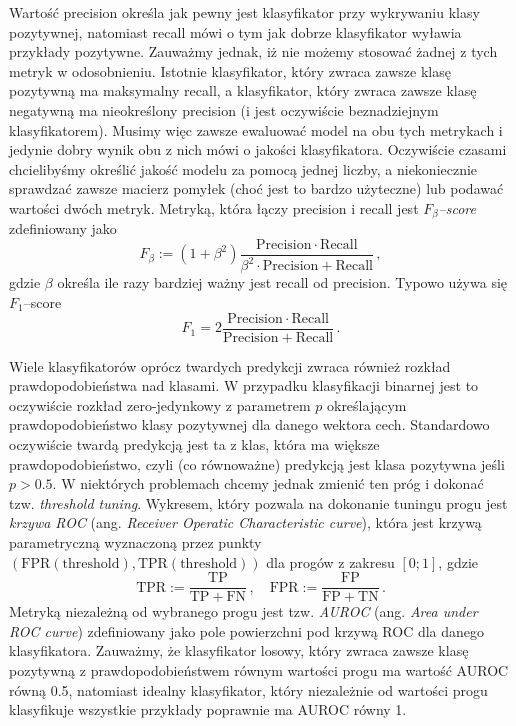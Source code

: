 \documentclass{myclass}
\begin{document}
Wartość precision określa jak pewny jest klasyfikator przy wykrywaniu klasy pozytywnej, natomiast
recall mówi o tym jak dobrze klasyfikator wyławia przykłady pozytywne. Zauważmy jednak, iż nie
możemy stosować żadnej z tych metryk w odosobnieniu. Istotnie klasyfikator, który zwraca zawsze
klasę pozytywną ma maksymalny recall, a klasyfikator, który zwraca zawsze klasę negatywną ma
nieokreślony precision (i jest oczywiście beznadziejnym klasyfikatorem). Musimy więc zawsze
ewaluować model na obu tych metrykach i jedynie dobry wynik obu z nich mówi o jakości klasyfikatora.
Oczywiście czasami chcielibyśmy określić jakość modelu za pomocą jednej liczby, a niekoniecznie
sprawdzać zawsze macierz pomyłek (choć jest to bardzo użyteczne) lub podawać wartości dwóch metryk.
Metryką, która łączy precision i recall jest \emph{\(F_\beta\)--score} zdefiniowany jako
\[
F_\beta := (1 + \beta^2) \frac{\mathrm{Precision} \cdot \mathrm{Recall}}{\beta^2 \cdot \mathrm{Precision} + \mathrm{Recall}}\,, 
\]
gdzie \(\beta\) określa ile razy bardziej ważny jest recall od precision. Typowo używa się
\(F_1\)--score
\[
F_1 = 2\frac{\mathrm{Precision} \cdot \mathrm{Recall}}{\mathrm{Precision} + \mathrm{Recall}}\,. 
\]

Wiele klasyfikatorów oprócz twardych predykcji zwraca również rozkład prawdopodobieństwa nad
klasami. W przypadku klasyfikacji binarnej jest to oczywiście rozkład zero-jedynkowy z parametrem
\(p\) określającym prawdopodobieństwo klasy pozytywnej dla danego wektora cech. Standardowo
oczywiście twardą predykcją jest ta z klas, która ma większe prawdopodobieństwo, czyli (co
równoważne) predykcją jest klasa pozytywna jeśli \(p > 0.5\). W niektórych problemach chcemy jednak
zmienić ten próg i dokonać tzw. \emph{threshold tuning}. Wykresem, który pozwala na dokonanie
tuningu progu jest \emph{krzywa ROC} (ang. \emph{Receiver Operatic Characteristic curve}), która
jest krzywą parametryczną wyznaczoną przez punkty \((\mathrm{FPR}(\mathrm{threshold}),
\mathrm{TPR}(\mathrm{threshold}))\) dla progów z zakresu \([0;1]\), gdzie
\[
\mathrm{TPR} := \frac{\mathrm{TP}}{\mathrm{TP + FN}}\,,\quad \mathrm{FPR} := \frac{\mathrm{FP}}{\mathrm{FP + TN}}\,.
\]
Metryką niezależną od wybranego progu jest tzw. \emph{AUROC} (ang. \emph{Area under ROC curve})
zdefiniowany jako pole powierzchni pod krzywą ROC dla danego klasyfikatora. Zauważmy, że
klasyfikator losowy, który zwraca zawsze klasę pozytywną z prawdopodobieństwem równym wartości progu
ma wartość AUROC równą 0.5, natomiast idealny klasyfikator, który niezależnie od wartości progu
klasyfikuje wszystkie przykłady poprawnie ma AUROC równy 1.
\end{document}
